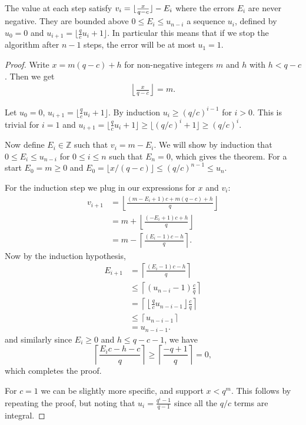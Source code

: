 The value at each step satisfy $v_i = \lfloor {\frac{x}{q-c}} \rfloor - E_i$ where
the errors $E_i$ are never negative.
They are bounded above $0\le E_i\le u_{n-i}$ a sequence $u_i$,
defined by $u_0=0$ and $u_{i+1} = \lfloor\frac{q}{c}u_i+1\rfloor$.
In particular this means that if we stop the algorithm after $n-1$ steps, the error will be at most $u_1=1$.
\begin{proof}
   Write $x = m(q-c)+h$ for non-negative integers $m$ and $h$ with $h<q-c$.
   Then we get
   \begin{align*}
      \left\lfloor\frac{x}{q-c}\right\rfloor = m.
      \label{eq:floor}
   \end{align*}

   Let $u_0=0$, $u_{i+1} = \lfloor\frac{q}{c}u_i+1\rfloor$.
   By induction $u_i \ge (q/c)^{i-1}$ for $i>0$.
   This is trivial for $i=1$ and $u_{i+1}=\lfloor \frac qc u_i +1\rfloor \ge \lfloor (q/c)^i + 1 \rfloor \ge (q/c)^i$.

   Now define $E_i\in\mathbb Z$ such that $v_i = m - E_i$.
   We will show by induction that $0\le E_{i} \le u_{n-i}$ for $0\le i\le n$ such that $E_n = 0$, which gives the theorem.
   For a start $E_0=m\ge 0$ and $E_0 = \lfloor x/(q-c)\rfloor \le (q/c)^{n-1} \le u_n$.

   For the induction step we plug in our expressions for $x$ and $v_i$:
   \begin{align*}
      v_{i+1}
      &= \left\lfloor \frac{(m-E_i+1)c+m(q-c)+h}{q}\right\rfloor
    \\&=
    m
    +
    \left\lfloor \frac{(- E_i+1)c +h}{q}\right\rfloor
    \\&=
    m
    - \left\lceil \frac{(E_i-1)c - h}{q}\right\rceil.
   \end{align*}
   Now by the induction hypothesis,
   \begin{align*}
      E_{i+1}
      &= \left\lceil \frac{(E_i-1)c - h}{q}\right\rceil
    \\&\le\left\lceil (u_{n-i}-1)\frac{c}{q}\right\rceil
    \\&= \left\lceil \left\lfloor \frac{q}{c}u_{n-i-1} \right\rfloor \frac{c}{q}\right\rceil
    \\&\le \left\lceil u_{n-i-1}\right\rceil
    \\&= u_{n-i-1}.
   \end{align*}
   and similarly since $E_i \ge 0$ and $h\le q-c-1$,
   we have
   $$\left\lceil \frac{E_ic - h - c}{q}\right\rceil \ge
   \left\lceil \frac{- q + 1}{q}\right\rceil = 0,$$
   which completes the proof.

   For $c=1$ we can be slightly more specific, and support $x < q^m$.
   This follows by repeating the proof, but noting that $u_i = \frac{q^i-1}{q-1}$ since all the $q/c$ terms are integral.
\end{proof}
